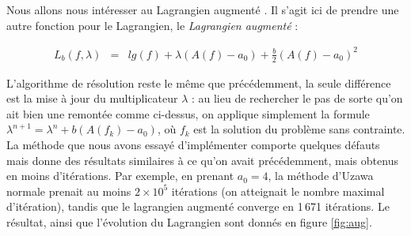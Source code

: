 \documentclass[10pt,a4paper]{article}
\theoremstyle{plain}
\theoremstyle{definition}
\begin{document}
Nous allons nous intéresser au Lagrangien augmenté \cite{cohen00}. Il s'agit ici de prendre une autre fonction pour le Lagrangien, le \emph{Lagrangien augmenté} :

\begin{eqnarray*}
L_b(f,\lambda)&=& lg(f) + \lambda\left(A(f)-a_0\right) + \frac{b}{2}\left(A(f)-a_0\right)^2
\end{eqnarray*}

L'algorithme de résolution reste le même que précédemment, la seule différence est la mise à jour du multiplicateur $\lambda$ : au lieu de rechercher le pas de sorte qu'on ait bien une remontée comme ci-dessus, on applique simplement la formule $\lambda^{n+1} = \lambda^n+b(A(f_k)-a_0)$, où $f_k$ est la solution du problème sans contrainte. La méthode que nous avons essayé d'implémenter comporte quelques défauts mais donne des résultats similaires à ce qu'on avait précédemment, mais obtenus en moins d'itérations.
Par exemple, en prenant $a_0=4$, la méthode d'Uzawa \og normale \fg{} prenait au moins $2\times 10^5$ itérations (on atteignait le nombre maximal d'itération), tandis que le lagrangien augmenté converge en 1\,671 itérations. Le résultat, ainsi que l'évolution du Lagrangien sont donnés en figure \ref{fig:aug}.
\end{document}
